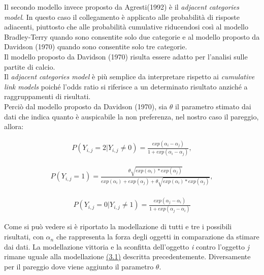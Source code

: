 Il secondo modello invece proposto da Agresti(1992) è il \emph{adjacent categories model}. In questo caso il collegamento è applicato alle probabilità di risposte adiacenti, piuttosto che alle probabilità cumulative riducendosi così al modello Bradley-Terry quando sono consentite solo due categorie e al modello proposto da Davidson (1970) quando sono consentite solo tre categorie.\\
Il modello proposto da Davidson (1970) risulta essere adatto per l'analisi sulle partite di calcio.\\
Il \emph{adjacent categories model} è più semplice da interpretare rispetto ai \emph{cumulative link models} poiché l'odds ratio si riferisce a un determinato risultato anziché a raggruppamenti di risultati. \\
Perciò dal modello proposto da Davidson (1970), sia $\theta$ il parametro stimato dai dati che indica quanto è auspicabile la non preferenza, nel nostro caso il pareggio, allora:

\begin{align}
	P(Y_{i,j} = 2 | Y_{i,j} \not = 0) =  \frac{exp(\alpha_{i} - \alpha_{j})}{1 + exp(\alpha_{i} - \alpha_{j})}, 
\end{align}
	
\begin{align}
	P(Y_{i,j} = 1) =  \frac{\theta \sqrt{exp(\alpha_{i}) * exp(\alpha_{j})}}{exp(\alpha_{i}) + exp(\alpha_{j}) + \theta\sqrt{exp(\alpha_{i}) * exp(\alpha_{j})}}, 
\end{align}

\begin{align}	
	P(Y_{i,j} = 0 | Y_{i,j} \not = 1) =  \frac{exp(\alpha_{j} - \alpha_{i})}{1 + exp(\alpha_{j} - \alpha_{i})}
\end{align}

Come si può vedere si è riportato la modellazione di tutti e tre i possibili risultati, con $\alpha_{n}$ che rappresenta la forza degli oggetti in comparazione da stimare dai dati. La modellazione vittoria e la sconfitta dell'oggetto \textit{i} contro l'oggetto \textit{j} rimane uguale alla modellazione \hyperref[for:3.1]{(3.1)} descritta precedentemente. Diversamente per il pareggio dove viene aggiunto il parametro $\theta$. \\

